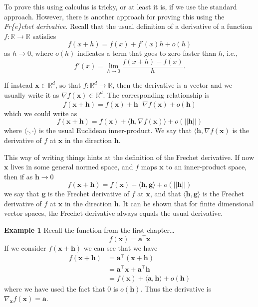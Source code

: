 \documentclass[
]{book}
\theoremstyle{definition}
\theoremstyle{definition}
\theoremstyle{definition}
\theoremstyle{definition}
\theoremstyle{remark}
\begin{document}
To prove this using calculus is tricky, or at least it is, if we use the standard approach. However, there is another approach for proving this using the \emph{Fr\textquotesingle\{e\}chet derivative}. Recall that the usual definition of a derivative of a function \(f: \mathbb{R}\rightarrow \mathbb{R}\) satisfies
\[f(x+h)=f(x)+f'(x)h +o(h)\]
as \(h \rightarrow 0\), where \(o(h)\) indicates a term that goes to zero faster than \(h\), i.e.,
\[f'(x) = \lim_{h\rightarrow 0} \frac{f(x+h)-f(x)}{h}.\]

If instead \(\mathbf x\in \mathbb{R}^d\), so that \(f: \mathbb{R}^d\rightarrow \mathbb{R}\), then the derivative is a vector and we usually write it as \(\nabla f(\mathbf x)\in \mathbb{R}^d\). The corresponding relationship is
\[f(\mathbf x+\mathbf h)=f(\mathbf x)+\mathbf h^\top \nabla f(\mathbf x) +o(\mathbf h)\]
which we could write as
\[f(\mathbf x+\mathbf h)=f(\mathbf x)+\langle\mathbf h, \nabla f(\mathbf x) \rangle+o(||\mathbf h||)\]
where \(\langle\cdot, \cdot \rangle\) is the usual Euclidean inner-product. We say that \(\langle\mathbf h, \nabla f(\mathbf x)\) is the derivative of \(f\) at \(\mathbf x\) in the direction \(\mathbf h\).

This way of writing things hints at the definition of the Frechet derivative. If now \(\mathbf x\) lives in some general normed space, and \(f\) maps \(\mathbf x\) to an inner-product space, then if as \(\mathbf h\rightarrow 0\)
\[f(\mathbf x+\mathbf h)=f(\mathbf x)+\langle\mathbf h, \mathbf g\rangle+o(||\mathbf h||)\]
we say that \(\mathbf g\) is the Frechet derivative of \(f\) at \(\mathbf x\), and that \(\langle\mathbf h, \mathbf g\rangle\) is the Frechet derivative of \(f\) at \(\mathbf x\) in the direction \(\mathbf h\). It can be shown that for finite dimensional vector spaces, the Frechet derivative always equals the usual derivative.

\textbf{Example 1}
Recall the function from the first chapter\ldots{}
\[f(\mathbf x) = \mathbf a^\top \mathbf x\]
If we consider \(f(\mathbf x+\mathbf h)\) we can see that we have
\begin{align*}
f(\mathbf x+\mathbf h) &=\mathbf a^\top(\mathbf x+\mathbf h)\\
&= \mathbf a^\top \mathbf x+\mathbf a^\top \mathbf h\\
&= f(\mathbf x)+\langle \mathbf a, \mathbf h\rangle +o(\mathbf h)
\end{align*}
where we have used the fact that \(0\) is \(o(\mathbf h)\). Thus the derivative is
\(\nabla_\mathbf xf(\mathbf x) =\mathbf a.\)
\end{document}
